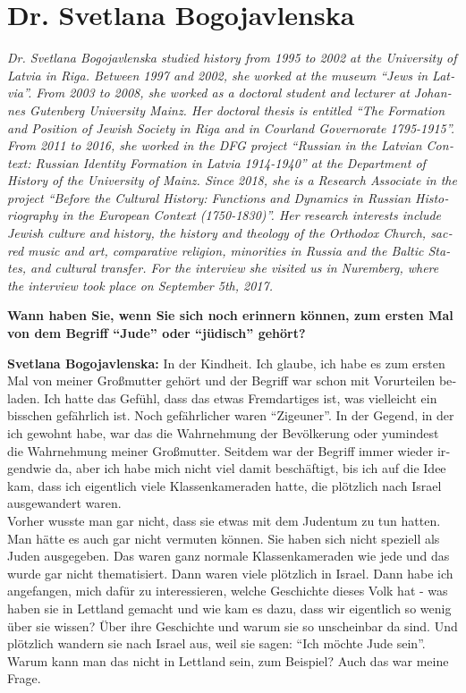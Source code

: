 \section{Dr. Svetlana Bogojavlenska}
\begin{otherlanguage}{ngerman}
\textit{Dr. Svetlana Bogojavlenska studied history from 1995 to 2002 at the University of Latvia in Riga. Between 1997 and 2002, she worked at the museum ``Jews in Latvia''. From 2003 to 2008, she worked as a doctoral student and lecturer at Johannes Gutenberg University Mainz. Her doctoral thesis is entitled ``The Formation and Position of Jewish Society in Riga and in Courland Governorate 1795-1915''. From 2011 to 2016, she worked in the DFG project ``Russian in the Latvian Context: Russian Identity Formation in Latvia 1914-1940'' at the Department of History of the University of Mainz. Since 2018, she is a Research Associate in the project ``Before the Cultural History: Functions and Dynamics in Russian Historiography in the European Context (1750-1830)''. Her research interests include Jewish culture and history, the history and theology of the Orthodox Church, sacred music and art, comparative religion, minorities in Russia and the Baltic States, and cultural transfer.
For the interview she visited us in Nuremberg, where the interview took place on September 5th, 2017.}\par
\vspace*{2em}
\textbf{Wann haben Sie, wenn Sie sich noch erinnern können, zum ersten Mal von dem Begriff "`Jude"' oder "`jüdisch"' gehört?}

\textbf{Svetlana Bogojavlenska:} In der Kindheit. Ich glaube, ich habe es zum ersten Mal von meiner Großmutter gehört und der Begriff war schon mit Vorurteilen beladen. Ich hatte das Gefühl, dass das etwas Fremdartiges ist, was vielleicht ein bisschen gefährlich ist. Noch gefährlicher waren "`Zigeuner"'. In der Gegend, in der ich gewohnt habe, war das die Wahrnehmung der Bevölkerung oder yumindest die Wahrnehmung meiner Großmutter. Seitdem war der Begriff immer wieder irgendwie da, aber ich habe mich nicht viel damit beschäftigt, bis ich auf die Idee kam, dass ich eigentlich viele Klassenkameraden hatte, die plötzlich nach Israel ausgewandert waren.\\
Vorher wusste man gar nicht, dass sie etwas mit dem Judentum zu tun hatten. Man hätte es auch gar nicht vermuten können. Sie haben sich nicht speziell als Juden ausgegeben. Das waren ganz normale Klassenkameraden wie jede und das wurde gar nicht thematisiert. Dann waren viele plötzlich in Israel. Dann habe ich angefangen, mich dafür zu interessieren, welche Geschichte dieses Volk hat - was haben sie in Lettland gemacht und wie kam es dazu, dass wir eigentlich so wenig über sie wissen? Über ihre Geschichte und warum sie so unscheinbar da sind. Und plötzlich wandern sie nach Israel aus, weil sie sagen: "`Ich möchte Jude sein"'. Warum kann man das nicht in Lettland sein, zum Beispiel? Auch das war meine Frage.


\end{otherlanguage}
